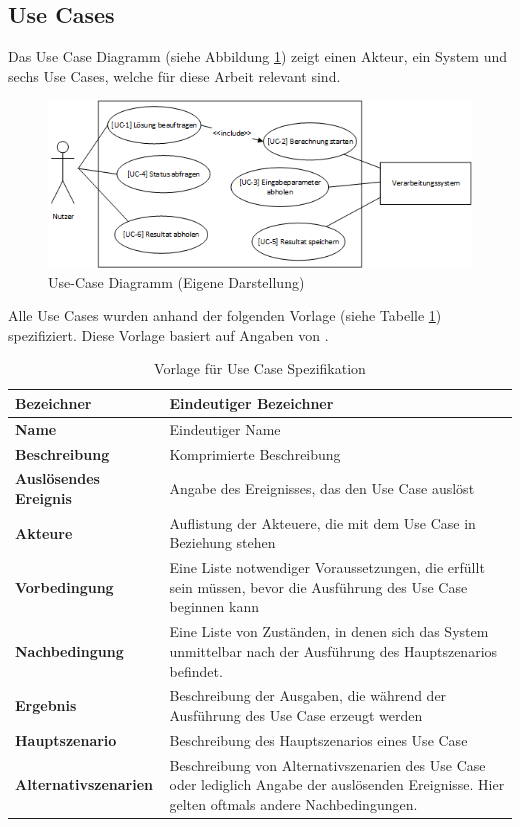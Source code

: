 \subsection{Use Cases}\label{use_cases}
Das Use Case Diagramm (siehe Abbildung \ref{fig:use_case}) zeigt einen Akteur, ein System und sechs Use Cases, welche für diese Arbeit relevant sind.
\begin{figure}[h]
\includegraphics{images/anforderungen/use_cases.png}
\caption[Use-Case Diagramm]{Use-Case Diagramm (Eigene Darstellung)}
\label{fig:use_case}
\end{figure}

Alle Use Cases wurden anhand der folgenden Vorlage (siehe Tabelle \ref{table:use_case_template}) spezifiziert. Diese Vorlage basiert auf Angaben von \cite{req_eng_book}.

\begin{table}[ht]
\centering
  \begin{tabular}{ l | p{10cm} }
	\hline
	\rowcolor{gray}
	\textbf{Bezeichner}&	\textbf{Eindeutiger Bezeichner}\\ \hline
	\textbf{Name}		&	Eindeutiger Name\\ \hline
	\textbf{Beschreibung}	&	Komprimierte Beschreibung\\ \hline
	\textbf{Auslösendes Ereignis} &	Angabe des Ereignisses, das den Use Case auslöst\\ \hline
	\textbf{Akteure}		&	Auflistung der Akteuere, die mit dem Use Case in Beziehung stehen\\ \hline
	\textbf{Vorbedingung}	&	Eine Liste notwendiger Voraussetzungen, die erfüllt sein müssen, bevor die Ausführung des Use Case beginnen kann\\ \hline
	\textbf{Nachbedingung}	&	Eine Liste von Zuständen, in denen sich das System unmittelbar nach der Ausführung des Hauptszenarios befindet.\\ \hline
	\textbf{Ergebnis}		&	Beschreibung der Ausgaben, die während der Ausführung des Use Case erzeugt werden\\ \hline
	\textbf{Hauptszenario}	&	Beschreibung des Hauptszenarios eines Use Case\\ \hline
	\textbf{Alternativszenarien}	&	Beschreibung von Alternativszenarien des Use Case oder lediglich Angabe der auslösenden Ereignisse. 
					Hier gelten oftmals andere Nachbedingungen.\\ \hline
  \end{tabular}
   \caption{Vorlage für Use Case Spezifikation}\label{table:use_case_template}
\end{table}

